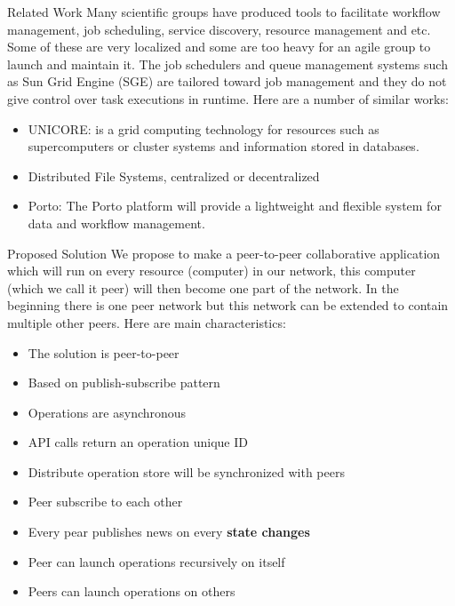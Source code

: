 \documentclass[final,hyperref={pdfpagelabels=true}]{beamer}
\begin{document}
\begin{frame}
\begin{columns}[t]
    \begin{column}{.45\textwidth}
      \begin{block}{Related Work}
        Many scientific groups have produced tools to facilitate workflow management, job scheduling,
        service discovery, resource management and etc. Some of these are very localized and some are
        too heavy for an agile group to launch and maintain it. The job schedulers and queue management
        systems such as Sun Grid Engine (SGE) are tailored toward job management and they do not give
        control over task executions in runtime.
        Here are a number of similar works:
        \begin{itemize}
        \item UNICORE: is a grid computing technology for resources such as supercomputers or cluster systems and information stored in databases.\cite{unicore}
        \item Distributed File Systems, centralized or decentralized
        \item Porto: The Porto platform will provide a lightweight and flexible system for data and workflow management.\cite{porto}
        \end{itemize}
      \end{block}
      
      \begin{block}{Proposed Solution}
      We propose to make a peer-to-peer collaborative application which will run on every resource (computer) in our network, this computer (which we call it peer) will then become one part of the network. In the beginning there is one peer network but this network can be extended to contain multiple other peers. Here are main characteristics:
      \begin{itemize}
      \item The solution is peer-to-peer
      \item Based on publish-subscribe pattern
      \item Operations are asynchronous
      \item API calls return an operation unique ID
      \item Distribute operation store will be synchronized with peers
      \item Peer subscribe to each other
      \item Every pear publishes news on every \textbf{state changes}
      \item Peer can launch operations recursively on itself
      \item Peers can launch operations on others
      \end{itemize}
      

\end{block}
\end{column}
\end{columns}
\end{frame}
\end{document}
